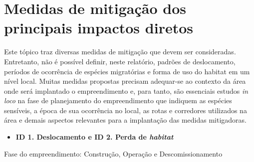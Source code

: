 \documentclass[
  oneside]{scrbook}
\providecommand{\tightlist}{%
  \setlength{\itemsep}{0pt}\setlength{\parskip}{0pt}}
\begin{document}
\hypertarget{medidas-de-mitigauxe7uxe3o-dos-principais-impactos-diretos}{%
\section{Medidas de mitigação dos principais impactos diretos}\label{medidas-de-mitigauxe7uxe3o-dos-principais-impactos-diretos}}

Este tópico traz diversas medidas de mitigação que devem ser consideradas. Entretanto, não é possível definir, neste relatório, padrões de deslocamento, períodos de ocorrência de espécies migratórias e forma de uso do habitat em um nível local. Muitas medidas propostas precisam adequar-se ao contexto da área onde será implantado o empreendimento e, para tanto, são essenciais estudos \emph{in loco} na fase de planejamento do empreendimento que indiquem as espécies sensíveis, a época de sua ocorrência no local, as rotas e corredores utilizados na área e demais aspectos relevantes para a implantação das medidas mitigadoras.

\begin{itemize}
\tightlist
\item
  \textbf{ID 1. Deslocamento e ID 2. Perda de \emph{habitat} }
\end{itemize}

Fase do empreendimento: Construção, Operação e Descomissionamento
\end{document}
